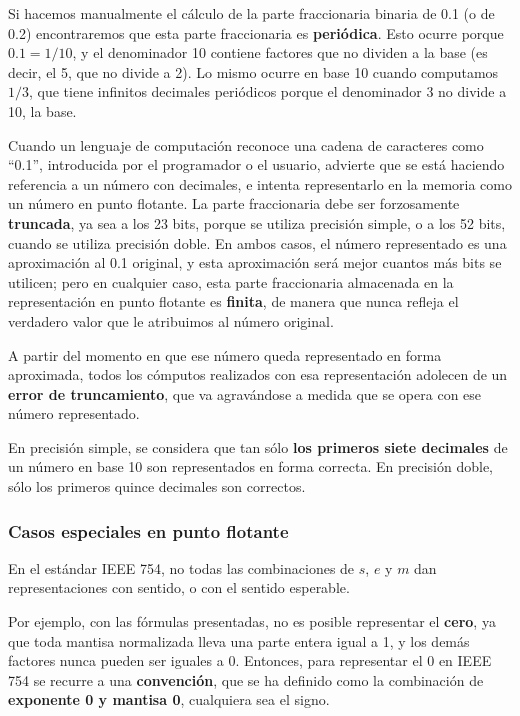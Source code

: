 \documentclass[spanish,a4paper,]{article}
\begin{document}
Si hacemos manualmente el cálculo de la parte fraccionaria binaria de
0.1 (o de 0.2) encontraremos que esta parte fraccionaria es
\textbf{periódica}. Esto ocurre porque \(0.1 = 1/10\), y el denominador
10 contiene factores que no dividen a la base (es decir, el 5, que no
divide a 2). Lo mismo ocurre en base 10 cuando computamos \(1/3\), que
tiene infinitos decimales periódicos porque el denominador 3 no divide a
10, la base.

Cuando un lenguaje de computación reconoce una cadena de caracteres como
``0.1'', introducida por el programador o el usuario, advierte que se
está haciendo referencia a un número con decimales, e intenta
representarlo en la memoria como un número en punto flotante. La parte
fraccionaria debe ser forzosamente \textbf{truncada}, ya sea a los 23
bits, porque se utiliza precisión simple, o a los 52 bits, cuando se
utiliza precisión doble. En ambos casos, el número representado es una
aproximación al 0.1 original, y esta aproximación será mejor cuantos más
bits se utilicen; pero en cualquier caso, esta parte fraccionaria
almacenada en la representación en punto flotante es \textbf{finita}, de
manera que nunca refleja el verdadero valor que le atribuimos al número
original.

A partir del momento en que ese número queda representado en forma
aproximada, todos los cómputos realizados con esa representación
adolecen de un \textbf{error de truncamiento}, que va agravándose a
medida que se opera con ese número representado.

En precisión simple, se considera que tan sólo \textbf{los primeros
siete decimales} de un número en base 10 son representados en forma
correcta. En precisión doble, sólo los primeros quince decimales son
correctos.

\hypertarget{casos-especiales-en-punto-flotante}{%
\subsubsection{Casos especiales en punto
flotante}\label{casos-especiales-en-punto-flotante}}

En el estándar IEEE 754, no todas las combinaciones de \(s\), \(e\) y
\(m\) dan representaciones con sentido, o con el sentido esperable.

Por ejemplo, con las fórmulas presentadas, no es posible representar el
\textbf{cero}, ya que toda mantisa normalizada lleva una parte entera
igual a 1, y los demás factores nunca pueden ser iguales a 0. Entonces,
para representar el 0 en IEEE 754 se recurre a una \textbf{convención},
que se ha definido como la combinación de \textbf{exponente 0 y mantisa
0}, cualquiera sea el signo.
\end{document}
